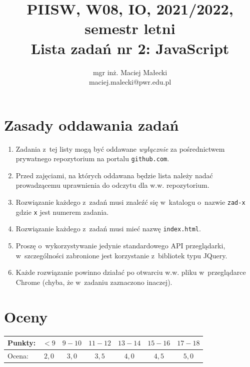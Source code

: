 \documentclass[12pt]{article}
\title{PIISW, W08, IO, 2021/2022, semestr letni\\Lista zadań nr 2: JavaScript}
\author{mgr inż. Maciej Małecki\\\small{maciej.malecki@pwr.edu.pl}}
\begin{document}
    \maketitle

    \section*{Zasady oddawania zadań}
        \begin{enumerate}
            \item Zadania z~tej listy mogą być oddawane \emph{wyłącznie} za pośrednictwem prywatnego repozytorium na portalu \texttt{github.com}.
            \item Przed zajęciami, na których oddawana będzie lista należy nadać prowadzącemu uprawnienia do odczytu dla w.w. repozytorium.
            \item Rozwiązanie każdego z~zadań musi znaleźć się w~katalogu o~nazwie \texttt{zad-x} gdzie \texttt{x} jest numerem zadania.
            \item Rozwiązanie każdego z~zadań musi mieć nazwę \texttt{index.html}.
            \item Proszę o~wykorzystywanie jedynie standardowego API przeglądarki, w~szczególności zabronione jest korzystanie z~bibliotek typu JQuery.
            \item Każde rozwiązanie powinno działać po otwarciu w.w. pliku w~przeglądarce Chrome (chyba, że w~zadaniu zaznaczono inaczej).
        \end{enumerate}

    \section*{Oceny}
    \begin{tabular}{|l|c|c|c|c|c|c|}
        \hline
        Punkty: & $<9$ & $9-10$ & $11-12$ & $13-14$ & $15-16$ & $17-18$\\
        \hline
        Ocena:  & $2,0$ & $3,0$ & $3,5$ & $4,0$ & $4,5$ & $5,0$\\
        \hline
    \end{tabular}
\end{document}
